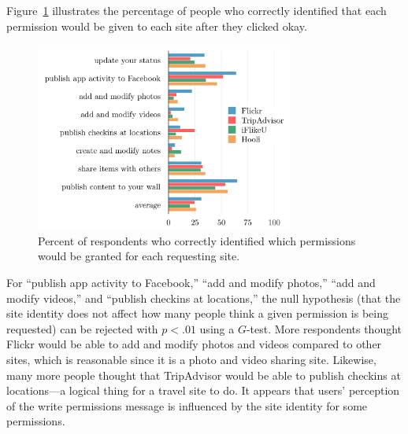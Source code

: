 \documentclass[twoside,letterpaper]{soups-poster}
\begin{document}
Figure~\ref{figure:multipercents} illustrates the percentage of people who correctly identified that each permission would be given to each site after they clicked okay.

\begin{figure}[h!]
  \centering
  \includegraphics[width=8.5cm]{multi_percents_cosn}
  \caption{Percent of respondents who correctly identified which permissions would be granted for each requesting site.}
  \label{figure:multipercents}
\end{figure}

For ``publish app activity to Facebook,'' ``add and modify photos,'' ``add and modify videos,'' and ``publish checkins at locations,'' the null hypothesis (that the site identity does not affect how many people think a given permission is being requested) can be rejected with $p < .01$ using a $G$-test. More respondents thought Flickr would be able to add and modify photos and videos compared to other sites, which is reasonable since it is a photo and video sharing site. Likewise, many more people thought that TripAdvisor would be able to publish checkins at locations---a logical thing for a travel site to do.
It appears that users' perception of the write permissions message is influenced by the site identity for some permissions.


  
\end{document}
